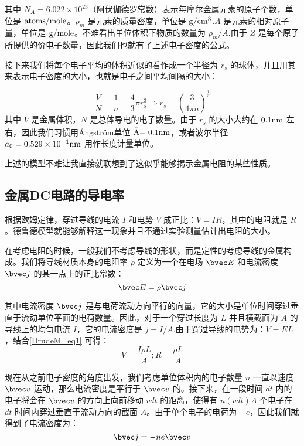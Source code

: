 其中 $N_A=6.022\times 10^{23}$（阿伏伽德罗常数）表示每摩尔金属元素的原子个数，单位是 $\rm{atoms/mole}$。$\rho_m$ 是元素的质量密度，单位是 $\rm{g/cm^3}$.$A$ 是元素的相对原子量，单位是 $\rm{g/mole}$。不难看出单位体积下物质的数量为 $\rho_m/A$.由于 $Z$ 是每个原子所提供的价电子数量，因此我们也就有了上述电子密度的公式。

接下来我们将每个电子平均的体积近似的看作成一个半径为 $r_s$ 的球体，并且用其来表示电子密度的大小，也就是电子之间平均间隔的大小：

\begin{equation}
\frac{V}{N}=\frac{1}{n}=\frac{4}{3}\pi r_s^3 \Rightarrow r_s=\left(\frac{3}{4\pi n}\right)^\frac{1}{3}
\end{equation}
其中 $V$ 是金属体积，$N$ 是总体导电的电子数量。由于 $r_s$ 的大小大约在 $0.1\rm{nm}$ 左右，因此我们习惯用Ångström单位 $\buildrel _{\circ} \over {\mathrm{A}}=0.1\rm{nm}$，或者波尔半径 $a_0=0.529\times 10^{-1}\rm{nm}$ 用作长度计量单位。

上述的模型不难让我直接就联想到了这似乎能够揭示金属电阻的某些性质。

\subsection{金属DC电路的导电率}

根据欧姆定律，穿过导线的电流 $I$ 和电势 $V$ 成正比：$V=IR$，其中的电阻就是 $R$。德鲁德模型就能够解释这一现象并且不通过实验测量估计出电阻的大小。

在考虑电阻的时候，一般我们不考虑导线的形状，而是定性的考虑导线的金属构成。我们将导线材质本身的电阻率 $\rho$ 定义为一个在电场 $\bvec E$ 和电流密度 $\bvec j$ 的某一点上的正比常数：
\begin{equation}\label{DrudeM_eq1}
\bvec E =\rho \bvec j
\end{equation}

其中电流密度 $\bvec j$ 是与电荷流动方向平行的向量，它的大小是单位时间穿过垂直于流动单位平面的电荷数量。因此，对于一个穿过长度为 $L$ 并且横截面为 $A$ 的导线上的均匀电流 $I$，它的电流密度是 $j=I/A$.由于穿过导线的电势为：$V=EL$，结合\autoref{DrudeM_eq1} 可得：
\begin{equation}
V=\frac{I\rho L}{A}; R = \frac{\rho L}{A}
\end{equation}

现在从之前电子密度的角度出发，我们考虑单位体积内的电子数量 $n$ 一直以速度 $\bvec v$ 运动，那么电流密度是平行于 $\bvec v$ 的。接下来，在一段时间 $dt$ 内的电子将会在 $\bvec v$ 的方向上向前移动 $v dt$ 的距离，使得有 $n(v dt)A$ 个电子在 $dt$ 时间内穿过垂直于流动方向的截面 $A$。由于单个电子的电荷为 $-e$，因此我们就得到了电流密度为：
\begin{equation}\label{DrudeM_eq2}
\bvec j = -ne\bvec v
\end{equation}

